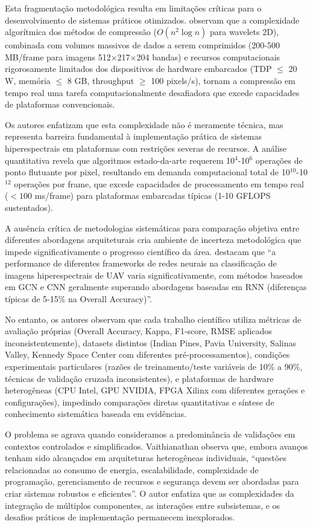 Esta fragmentação metodológica resulta em limitações críticas para o 
desenvolvimento de sistemas práticos otimizados. \textcite{Diaz2019} observam 
que a complexidade algorítmica dos métodos de compressão ($O(n^2 \log n)$ 
para wavelets 2D), combinada com volumes massivos de dados a serem comprimidos 
(200-500 MB/frame para imagens 512×217×204 bandas) e recursos computacionais 
rigorosamente limitados dos dispositivos de hardware embarcados (TDP $\leq$ 20 W, 
memória $\leq$ 8 GB, throughput $\geq$ 100 pixels/s), tornam a compressão 
em tempo real uma tarefa computacionalmente desafiadora que excede capacidades 
de plataformas convencionais.

Os autores enfatizam que esta complexidade não é meramente técnica, mas 
representa barreira fundamental à implementação prática de sistemas 
hiperespectrais em plataformas com restrições severas de recursos. A análise 
quantitativa revela que algoritmos estado-da-arte requerem 10$^4$-10$^6$ 
operações de ponto flutuante por pixel, resultando em demanda computacional 
total de 10$^{10}$-10$^{12}$ operações por frame, que excede capacidades 
de processamento em tempo real ($< 100$ ms/frame) para plataformas embarcadas 
típicas (1-10 GFLOPS sustentados).

A ausência crítica de metodologias sistemáticas para comparação objetiva 
entre diferentes abordagens arquiteturais cria ambiente de incerteza 
metodológica que impede significativamente o progresso científico da área. 
\textcite{Zhang2024} destacam que ``a performance de diferentes frameworks 
de redes neurais na classificação de imagens hiperespectrais de UAV varia 
significativamente, com métodos baseados em GCN e CNN geralmente superando 
abordagens baseadas em RNN (diferenças típicas de 5-15\% na Overall Accuracy)''.

No entanto, os autores observam que cada trabalho científico utiliza métricas 
de avaliação próprias (Overall Accuracy, Kappa, F1-score, RMSE aplicados 
inconsistentemente), datasets distintos (Indian Pines, Pavia University, 
Salinas Valley, Kennedy Space Center com diferentes pré-processamentos), 
condições experimentais particulares (razões de treinamento/teste variáveis 
de 10\% a 90\%, técnicas de validação cruzada inconsistentes), e plataformas 
de hardware heterogêneas (CPU Intel, GPU NVIDIA, FPGA Xilinx com diferentes 
gerações e configurações), impedindo comparações diretas quantitativas e 
síntese de conhecimento sistemática baseada em evidências.

O problema se agrava quando consideramos a predominância de validações em 
contextos controlados e simplificados. Vaithianathan observa que, embora 
avanços tenham sido alcançados em arquiteturas heterogêneas individuais, 
``questões relacionadas ao consumo de energia, escalabilidade, complexidade 
de programação, gerenciamento de recursos e segurança devem ser abordadas 
para criar sistemas robustos e eficientes''. O 
autor enfatiza que as complexidades da integração de múltiplos componentes, 
as interações entre subsistemas, e os desafios práticos de implementação 
permanecem inexplorados.

